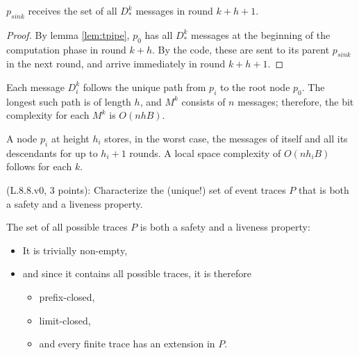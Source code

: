 \begin{theorem}
$p_{sink}$ receives the set of all $D_*^k$ messages in round $k + h + 1$.
\end{theorem}

\begin{proof}
By lemma \ref{lem:tpipe}, $p_0$ has all $D_*^k$ messages at the beginning
of the computation phase in round $k + h$.
By the code, these are sent to its parent $p_{sink}$ in the next
round, and arrive immediately in round $k + h + 1$.
\end{proof}

Each message $D_i^k$ follows the unique path from $p_i$ to the root node $p_0$.
The longest such path is of length $h$, and $M^k$ consists of $n$ messages;
therefore, the bit complexity for each $M^k$ is $O(nhB)$.

A node $p_i$ at height $h_i$ stores, in the worst case, the messages of itself and
all its descendants for up to $h_i + 1$ rounds. A local space complexity of
$O(nh_iB)$ follows for each $k$.


\begin{Exc}{(L.8.8.v0, 3 points):}
Characterize the (unique!) set of event traces $P$ that is both
a safety and a liveness property.
\end{Exc}


The set of all possible traces $P$ is both a safety and a liveness property:

\begin{itemize}
\item It is trivially non-empty,
\item and since it contains all possible traces, it is therefore
    \begin{itemize}
    \item prefix-closed,
    \item limit-closed,
    \item and every finite trace has an extension in $P$.
    \end{itemize}
\end{itemize}


